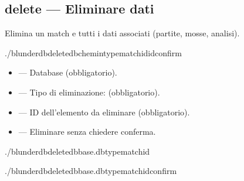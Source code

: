 \documentclass[letterpaper,10pt,italian]{sphinxmanual}
\begin{document}
\subsection{delete — Eliminare dati}
\label{\detokenize{cli:delete-supprimer-des-donnees}}
\sphinxAtStartPar
Elimina un match e tutti i dati associati (partite, mosse, analisi).

\begin{sphinxVerbatim}[commandchars=\\\{\}]
./blunderdbdelete\PYGZhy{}\PYGZhy{}db\PYGZlt{}chemin\PYGZgt{}\PYGZhy{}\PYGZhy{}typematch\PYGZhy{}\PYGZhy{}id\PYGZlt{}id\PYGZgt{}\PYG{o}{[}\PYGZhy{}\PYGZhy{}confirm\PYG{o}{]}
\end{sphinxVerbatim}

\sphinxAtStartPar
{}
\begin{itemize}
\item {} 
\sphinxAtStartPar
{} — Database (obbligatorio).

\item {} 
\sphinxAtStartPar
{} — Tipo di eliminazione:  (obbligatorio).

\item {} 
\sphinxAtStartPar
{} — ID dell’elemento da eliminare (obbligatorio).

\item {} 
\sphinxAtStartPar
{} — Eliminare senza chiedere conferma.

\end{itemize}

\sphinxAtStartPar
{}

\begin{sphinxVerbatim}[commandchars=\\\{\}]
./blunderdbdelete\PYGZhy{}\PYGZhy{}dbbase.db\PYGZhy{}\PYGZhy{}typematch\PYGZhy{}\PYGZhy{}id

./blunderdbdelete\PYGZhy{}\PYGZhy{}dbbase.db\PYGZhy{}\PYGZhy{}typematch\PYGZhy{}\PYGZhy{}id\PYGZhy{}\PYGZhy{}confirm
\end{sphinxVerbatim}
\end{document}
